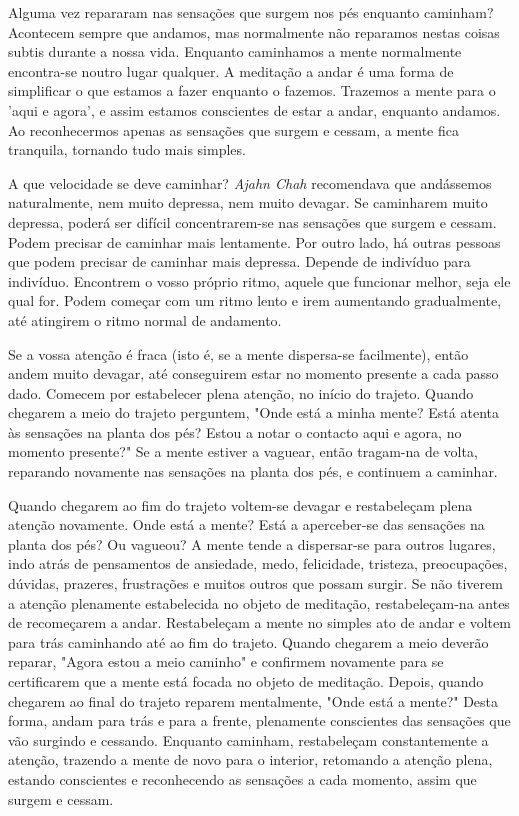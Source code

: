 Alguma vez repararam nas sensações que surgem nos pés enquanto caminham?
Acontecem sempre que andamos, mas normalmente não reparamos nestas
coisas subtis durante a nossa vida. Enquanto caminhamos a mente
normalmente encontra-se noutro lugar qualquer. A meditação a andar é uma
forma de simplificar o que estamos a fazer enquanto o fazemos. Trazemos
a mente para o 'aqui e agora', e assim estamos conscientes de estar a
andar, enquanto andamos. Ao reconhecermos apenas as sensações que surgem
e cessam, a mente fica tranquila, tornando tudo mais simples.

A que velocidade se deve caminhar? \emph{Ajahn Chah} recomendava que
andássemos naturalmente, nem muito depressa, nem muito devagar. Se
caminharem muito depressa, poderá ser difícil concentrarem-se nas
sensações que surgem e cessam. Podem precisar de caminhar mais
lentamente. Por outro lado, há outras pessoas que podem precisar de
caminhar mais depressa. Depende de indivíduo para indivíduo. Encontrem o
vosso próprio ritmo, aquele que funcionar melhor, seja ele qual for.
Podem começar com um ritmo lento e irem aumentando gradualmente, até
atingirem o ritmo normal de andamento.

Se a vossa atenção é fraca (isto é, se a mente dispersa-se facilmente),
então andem muito devagar, até conseguirem estar no momento presente a
cada passo dado. Comecem por estabelecer plena atenção, no início do
trajeto. Quando chegarem a meio do trajeto perguntem, "Onde está a minha
mente? Está atenta às sensações na planta dos pés? Estou a notar o
contacto aqui e agora, no momento presente?" Se a mente estiver a
vaguear, então tragam-na de volta, reparando novamente nas sensações na
planta dos pés, e continuem a caminhar.

Quando chegarem ao fim do trajeto voltem-se devagar e restabeleçam plena
atenção novamente. Onde está a mente? Está a aperceber-se das sensações
na planta dos pés? Ou vagueou? A mente tende a dispersar-se para outros
lugares, indo atrás de pensamentos de ansiedade, medo, felicidade,
tristeza, preocupações, dúvidas, prazeres, frustrações e muitos outros
que possam surgir. Se não tiverem a atenção plenamente estabelecida no
objeto de meditação, restabeleçam-na antes de recomeçarem a andar.
Restabeleçam a mente no simples ato de andar e voltem para trás
caminhando até ao fim do trajeto. Quando chegarem a meio deverão
reparar, "Agora estou a meio caminho" e confirmem novamente para se
certificarem que a mente está focada no objeto de meditação. Depois,
quando chegarem ao final do trajeto reparem mentalmente, "Onde está a
mente?" Desta forma, andam para trás e para a frente, plenamente
conscientes das sensações que vão surgindo e cessando. Enquanto
caminham, restabeleçam constantemente a atenção, trazendo a mente de
novo para o interior, retomando a atenção plena, estando conscientes e
reconhecendo as sensações a cada momento, assim que surgem e cessam.

